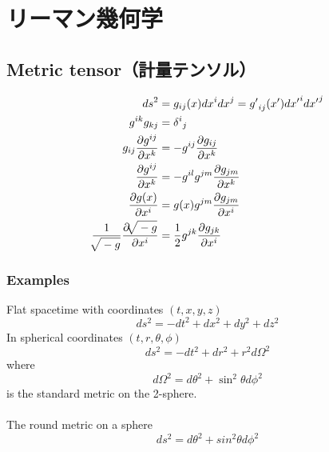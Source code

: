 %
%
%
%
\section{リーマン幾何学}


%
%
\subsection{Metric tensor（計量テンソル）}
\begin{align}
  {ds}^2
    & = g_{ij}(x) {dx}^{i} {dx}^{j} = {g'}_{ij}(x') {dx'}^{i} {dx'}^{j} \\
  g^{ik} g_{kj}
    & = {{\delta }^i}_j \\
  g_{ij} \frac{\partial g^{ij}}{\partial x^k}
    & = -g^{ij} \frac{\partial g_{ij}}{\partial x^k} \\
  \frac{\partial g^{ij}}{\partial x^k}
    & = - g^{il} g^{jm} \frac{\partial g_{jm}}{\partial x^k} \\
  \frac{\partial g(x)}{\partial x^i}
    & = g(x) g^{jm} \frac{\partial g_{jm}}{\partial x^i} \\
  \frac{1}{\sqrt[]{\mathstrut -g}} \frac{\partial \sqrt[]{\mathstrut -g}}{\partial x^i}
    & = \frac{1}{2} g^{jk} \frac{\partial g_{jk}}{\partial x^i}
\end{align}


\subsubsection{Examples}
Flat spacetime with coordinates $ (t, x, y, z) $
\begin{equation}
  ds^2 = -dt^2 +dx^2 + dy^2 + dz^2
\end{equation}
In spherical coordinates $ (t, r, \theta, \phi) $
\begin{equation}
  ds^2 = -dt^2 + dr^2 + r^2d\Omega^2
\end{equation}
where
\begin{equation}
  d\Omega^2 = d\theta^2 + \sin^2 \theta d\phi^2
\end{equation}
is the standard metric on the 2-sphere.\\
\\
The round metric on a sphere
\begin{equation}
  ds^2 = d{\theta }^2 + sin^2\theta d\phi^2
\end{equation}


